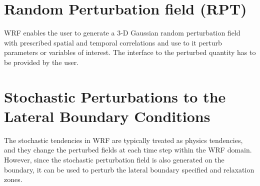 \section {Random Perturbation field (RPT)}
WRF enables the user to generate a 3-D Gaussian random perturbation field
with prescribed spatial and temporal correlations and use to it perturb
parameters or variables of interest. The interface to the perturbed quantity
has to be provided by the user. 

\section {Stochastic Perturbations to the Lateral Boundary Conditions}
The stochastic tendencies in WRF are typically treated as physics tendencies, and 
they change the perturbed fields at each time step within the WRF domain. However, since 
the stochastic perturbation field is also generated on the boundary, it can be used to 
perturb the lateral boundary specified and relaxation zones.
